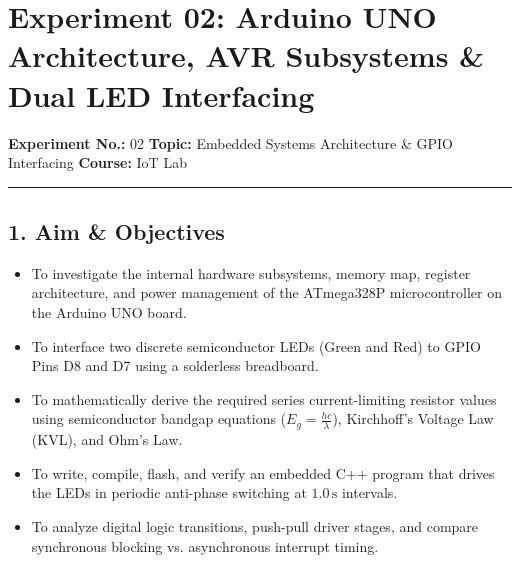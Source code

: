 \documentclass[11pt,a4paper]{article}
\begin{document}
\newpage

\section*{Experiment 02: Arduino UNO Architecture, AVR Subsystems \& Dual LED Interfacing}
\noindent\textbf{Experiment No.:} 02 \hfill \textbf{Topic:} Embedded Systems Architecture \& GPIO Interfacing \hfill \textbf{Course:} IoT Lab
\vspace{0.05cm}
\hrule
\vspace{0.25cm}

\subsection*{1. Aim \& Objectives}
\begin{itemize}[noitemsep]
    \item To investigate the internal hardware subsystems, memory map, register architecture, and power management of the ATmega328P microcontroller on the Arduino UNO board.
    \item To interface two discrete semiconductor LEDs (Green and Red) to GPIO Pins D8 and D7 using a solderless breadboard.
    \item To mathematically derive the required series current-limiting resistor values using semiconductor bandgap equations ($E_g = \frac{hc}{\lambda}$), Kirchhoff's Voltage Law (KVL), and Ohm's Law.
    \item To write, compile, flash, and verify an embedded C++ program that drives the LEDs in periodic anti-phase switching at $1.0\,\text{s}$ intervals.
    \item To analyze digital logic transitions, push-pull driver stages, and compare synchronous blocking vs. asynchronous interrupt timing.
\end{itemize}
\end{document}
